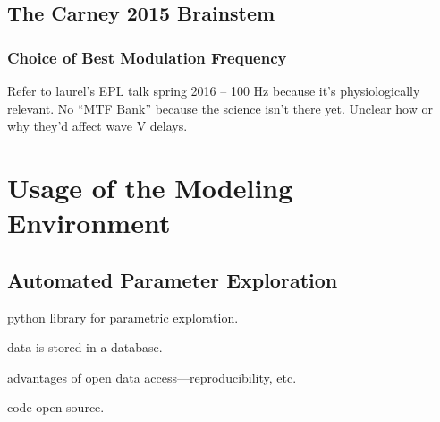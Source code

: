 \subsection{The Carney 2015 Brainstem} %
\label{sub:the_carney_2015_brainstem}

\subsubsection{Choice of Best Modulation Frequency}
Refer to laurel's EPL talk spring 2016 -- 100 Hz because it's physiologically relevant.  No ``MTF Bank'' because the science isn't there yet. Unclear how or why they'd affect wave V delays. 


\section{Usage of the Modeling Environment} %
\label{sec:usage_of_the_modeling_environment}
\subsection{Automated Parameter Exploration} %
\label{sub:automated_parameter_exploration}
python library for parametric exploration. 

data is stored in a database. 

advantages of open data access---reproducibility, etc. 

code open source. 
